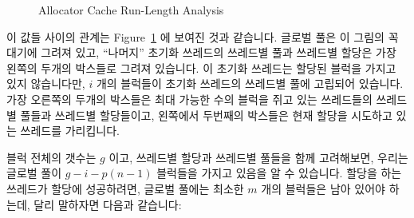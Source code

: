 {	\begin{figure}[tb]
	\centering
	\caption{Allocator Cache Run-Length Analysis}
	\label{fig:SMPdesign:Allocator Cache Run-Length Analysis}
	\end{figure}

	이 값들 사이의 관계는
	Figure~\ref{fig:SMPdesign:Allocator Cache Run-Length Analysis} 에
	보여진 것과 같습니다.
	글로벌 풀은 이 그림의 꼭대기에 그려져 있고, ``나머지'' 초기화 쓰레드의
	쓰레드별 풀과 쓰레드별 할당은 가장 왼쪽의 두개의 박스들로 그려져
	있습니다.
	이 초기화 쓰레드는 할당된 블럭을 가지고 있지 않습니다만, $i$ 개의
	블럭들이 초기화 쓰레드의 쓰레드별 풀에 고립되어 있습니다.
	가장 오른쪽의 두개의 박스들은 최대 가능한 수의 블럭을 쥐고 있는
	쓰레드들의 쓰레드별 풀들과 쓰레드별 할당들이고, 왼쪽에서 두번째의
	박스들은 현재 할당을 시도하고 있는 쓰레드를 가리킵니다.

	블럭 전체의 갯수는 $g$ 이고, 쓰레드별 할당과 쓰레드별 풀들을 함께
	고려해보면, 우리는 글로벌 풀이 $g-i-p(n-1)$ 블럭들을 가지고 있음을 알
	수 있습니다.
	할당을 하는 쓰레드가 할당에 성공하려면, 글로벌 풀에는 최소한 $m$ 개의
	블럭들은 남아 있어야 하는데, 달리 말하자면 다음과 같습니다:

}

